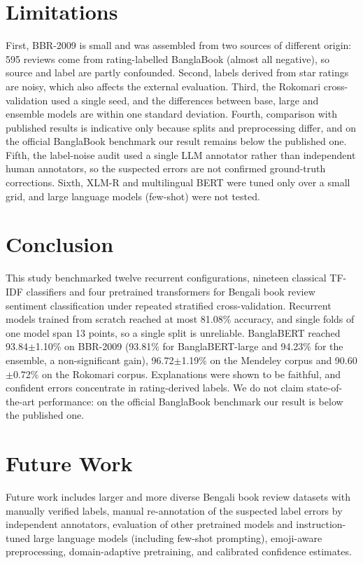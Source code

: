\documentclass[journal]{IEEEtran}
\newcommand{\pmstd}[2]{#1$\pm$#2}
\begin{document}
\section{Limitations}
First, BBR-2009 is small and was assembled from two sources of different origin: 595 reviews come from rating-labelled BanglaBook (almost all negative), so source and label are partly confounded. Second, labels derived from star ratings are noisy, which also affects the external evaluation. Third, the Rokomari cross-validation used a single seed, and the differences between base, large and ensemble models are within one standard deviation. Fourth, comparison with published results is indicative only because splits and preprocessing differ, and on the official BanglaBook benchmark our result remains below the published one. Fifth, the label-noise audit used a single LLM annotator rather than independent human annotators, so the suspected errors are not confirmed ground-truth corrections. Sixth, XLM-R and multilingual BERT were tuned only over a small grid, and large language models (few-shot) were not tested.

\section{Conclusion}
This study benchmarked twelve recurrent configurations, nineteen classical TF-IDF classifiers and four pretrained transformers for Bengali book review sentiment classification under repeated stratified cross-validation. Recurrent models trained from scratch reached at most 81.08\% accuracy, and single folds of one model span 13 points, so a single split is unreliable. BanglaBERT reached \pmstd{93.84}{1.10}\% on BBR-2009 (93.81\% for BanglaBERT-large and 94.23\% for the ensemble, a non-significant gain), \pmstd{96.72}{1.19}\% on the Mendeley corpus and \pmstd{90.60}{0.72}\% on the Rokomari corpus. Explanations were shown to be faithful, and confident errors concentrate in rating-derived labels. We do not claim state-of-the-art performance: on the official BanglaBook benchmark our result is below the published one.

\section{Future Work}
Future work includes larger and more diverse Bengali book review datasets with manually verified labels, manual re-annotation of the suspected label errors by independent annotators, evaluation of other pretrained models and instruction-tuned large language models (including few-shot prompting), emoji-aware preprocessing, domain-adaptive pretraining, and calibrated confidence estimates.
\end{document}
